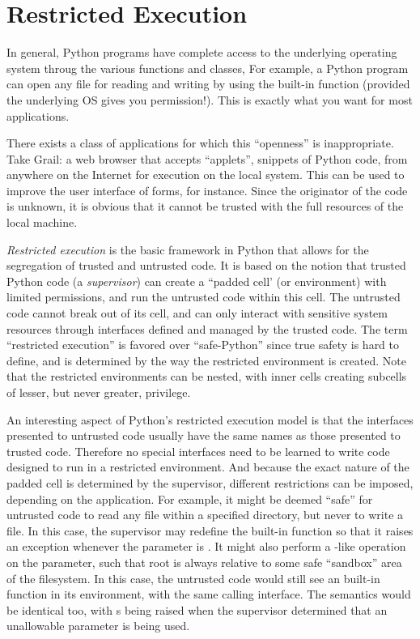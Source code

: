 \chapter{Restricted Execution}
\label{restricted}

In general, Python programs have complete access to the underlying
operating system throug the various functions and classes, For
example, a Python program can open any file for reading and writing by
using the  built-in function (provided the underlying OS
gives you permission!).  This is exactly what you want for most
applications.

There exists a class of applications for which this ``openness'' is
inappropriate.  Take Grail: a web browser that accepts ``applets'',
snippets of Python code, from anywhere on the Internet for execution
on the local system.  This can be used to improve the user interface
of forms, for instance.  Since the originator of the code is unknown,
it is obvious that it cannot be trusted with the full resources of the
local machine.

\emph{Restricted execution} is the basic framework in Python that allows
for the segregation of trusted and untrusted code.  It is based on the
notion that trusted Python code (a \emph{supervisor}) can create a
``padded cell' (or environment) with limited permissions, and run the
untrusted code within this cell.  The untrusted code cannot break out
of its cell, and can only interact with sensitive system resources
through interfaces defined and managed by the trusted code.  The term
``restricted execution'' is favored over ``safe-Python''
since true safety is hard to define, and is determined by the way the
restricted environment is created.  Note that the restricted
environments can be nested, with inner cells creating subcells of
lesser, but never greater, privilege.

An interesting aspect of Python's restricted execution model is that
the interfaces presented to untrusted code usually have the same names
as those presented to trusted code.  Therefore no special interfaces
need to be learned to write code designed to run in a restricted
environment.  And because the exact nature of the padded cell is
determined by the supervisor, different restrictions can be imposed,
depending on the application.  For example, it might be deemed
``safe'' for untrusted code to read any file within a specified
directory, but never to write a file.  In this case, the supervisor
may redefine the built-in
 function so that it raises an exception whenever the
 parameter is .  It might also perform a
-like operation on the  parameter, such
that root is always relative to some safe ``sandbox'' area of the
filesystem.  In this case, the untrusted code would still see an
built-in  function in its environment, with the same
calling interface.  The semantics would be identical too, with
s being raised when the supervisor determined that an
unallowable parameter is being used.

